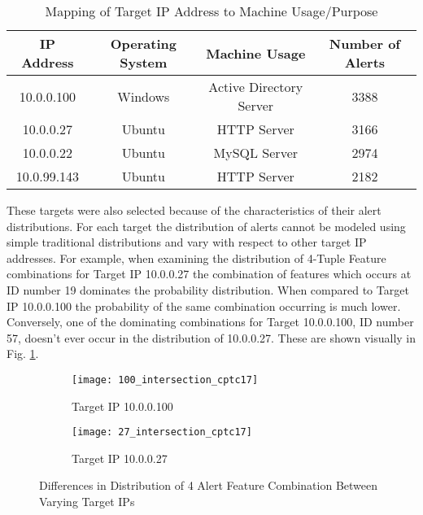 \begin{table}[!htbp]
	\caption{Mapping of Target IP Address to Machine Usage/Purpose}
	\label{tab:mapping}
	\centering
	\begin{tabular}{c|c|c|c}
		\textbf{IP Address} & \textbf{Operating System} & \textbf{Machine Usage} & \textbf{Number of Alerts}\\
		\hline
		10.0.0.100 & Windows & Active Directory Server & 3388\\
		\hline
		10.0.0.27 & Ubuntu & HTTP Server & 3166\\
		\hline
		10.0.0.22 & Ubuntu & MySQL Server & 2974\\
		\hline
		10.0.99.143 & Ubuntu & HTTP Server & 2182
	\end{tabular}
\end{table}

These targets were also selected because of the characteristics of their alert distributions. For each target the distribution of alerts cannot be modeled using simple traditional distributions and vary with respect to other target IP addresses. For example, when examining the distribution of 4-Tuple Feature combinations for Target IP 10.0.0.27 the combination of features which occurs at ID number 19 dominates the probability distribution. When compared to Target IP 10.0.0.100 the probability of the same combination occurring is much lower. Conversely, one of the dominating combinations for Target 10.0.0.100, ID number 57, doesn't ever occur in the distribution of 10.0.0.27. These are shown visually in Fig. \ref{fig:histograms}.
\begin{figure}[!htbp]
	\centering

	\begin{subfigure}{.75\textwidth}
		\texttt{[image: 100\_intersection\_cptc17]}
	\end{subfigure}%
	\begin{subfigure}{.25\textwidth}
		\caption{
			Target IP 10.0.0.100
		}
	\end{subfigure}%

	\begin{subfigure}{.75\textwidth}
		\texttt{[image: 27\_intersection\_cptc17]}
	\end{subfigure}%
	\begin{subfigure}{.25\textwidth}
		\caption{
			Target IP 10.0.0.27
		}
	\end{subfigure}%
	\caption{Differences in Distribution of 4 Alert Feature Combination Between Varying Target IPs}
	\label{fig:histograms}
\end{figure}

